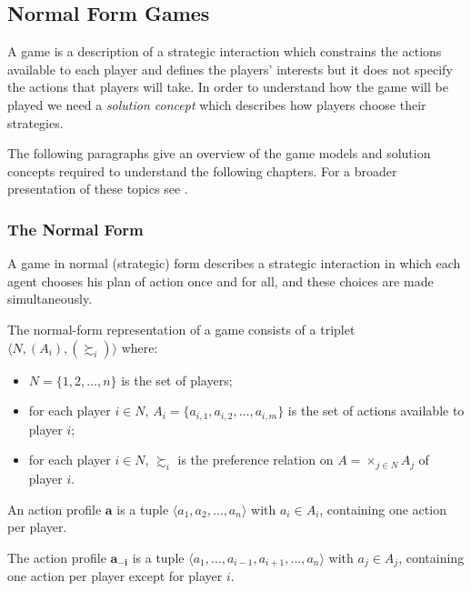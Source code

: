 \subsection {Normal Form Games}
A game is a description of a strategic interaction which constrains the actions available to each player and defines the players' interests but it does not specify the actions that players will take. In order to understand how the game will be played we need a \textit{solution concept} which describes how players choose their strategies.

The following paragraphs give an overview of the game models and solution concepts required to understand the following chapters. For a broader presentation of these topics see \citep{Fudenberg,Osborne1994}.   

\subsubsection{The Normal Form}
A game in normal (strategic) form describes a strategic interaction in which each agent chooses his plan of action once and for all, and these choices are made simultaneously. 
\begin{definition}
	The normal-form representation of a game consists of a triplet $\langle N, (A_{i}), (\succsim_{i})\rangle$ where:
	\begin{itemize}
		\item $N=\{1,2,\ldots,n\}$ is the set of players;
		\item for each player $i \in N$, $A_{i}=\{a_{i,1},a_{i,2},\ldots,a_{i,m}\}$ is the set of actions available to player $i$;
		\item for each player $i \in N$, $\succsim_{i}$ is the preference relation on $A=\times_{j\in N}A_{j}$ of player $i$.
	\end{itemize}
\end{definition}

\begin{definition}
	An action profile $\mathbf{a}$ is a tuple $\langle a_{1},a_{2}, \ldots, a_{n}\rangle$ with $a_{i}\in A_{i}$, containing one action per player. 
	
	The action profile $\mathbf{a_{-i}}$ is a tuple $\langle a_{1},\ldots,a_{i-1},a_{i+1},\ldots,a_{n}\rangle$ with $a_{j} \in A_{j}$, containing one action per player except for player $i$.
\end{definition}

